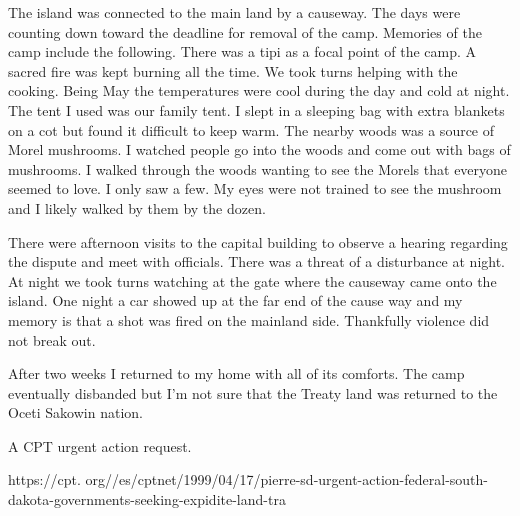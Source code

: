 The island was connected to the main land by a causeway.
The days were counting down toward the deadline for removal of the camp.
Memories of the camp include the following.
There was a tipi as a focal point of the camp.
A sacred fire was kept burning all the time.
We took turns helping with the cooking.
Being May the temperatures were cool during the day and cold at night.
The tent I used was our family tent.
I slept in a sleeping bag with extra blankets on a cot but found it difficult to keep warm.
The nearby woods was a source of Morel mushrooms.
I watched people go into the woods and come out with bags of mushrooms.
I walked through the woods wanting to see the Morels that everyone seemed to love.
I only saw a few.
My eyes were not trained to see the mushroom and I likely walked by them by the dozen.

There were afternoon visits to the capital building to observe a hearing regarding the dispute and meet with officials.
There was a threat of a disturbance at night.
At night we took turns watching at the gate where the causeway came onto the island.
One night a car showed up at the far end of the cause way and my memory is that a shot was fired on the mainland side.
Thankfully violence did not break out.

After two weeks I returned to my home with all of its comforts.
The camp eventually disbanded but I'm not sure that the Treaty land was returned to the Oceti Sakowin nation.

A CPT urgent action request.

https://cpt.
org//es/cptnet/1999/04/17/pierre-sd-urgent-action-federal-south-dakota-governments-seeking-expidite-land-tra





